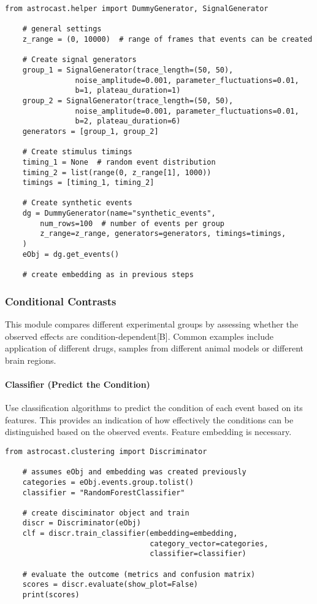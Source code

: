 \begin{lstlisting}[style=pyStyle]
    from astrocast.helper import DummyGenerator, SignalGenerator

    # general settings
    z_range = (0, 10000)  # range of frames that events can be created

    # Create signal generators
    group_1 = SignalGenerator(trace_length=(50, 50),
                noise_amplitude=0.001, parameter_fluctuations=0.01,
                b=1, plateau_duration=1)
    group_2 = SignalGenerator(trace_length=(50, 50),
                noise_amplitude=0.001, parameter_fluctuations=0.01,
                b=2, plateau_duration=6)
    generators = [group_1, group_2]

    # Create stimulus timings
    timing_1 = None  # random event distribution
    timing_2 = list(range(0, z_range[1], 1000))
    timings = [timing_1, timing_2]

    # Create synthetic events
    dg = DummyGenerator(name="synthetic_events",
        num_rows=100  # number of events per group
        z_range=z_range, generators=generators, timings=timings,
    )
    eObj = dg.get_events()

    # create embedding as in previous steps
\end{lstlisting}

\subsubsection{Conditional Contrasts}
This module compares different experimental groups by assessing whether the observed effects are condition-dependent[B]. Common examples include application of different drugs, samples from different animal models or different brain regions.

\paragraph{Classifier (Predict the Condition)}
Use classification algorithms to predict the condition of each event based on its features. This provides an indication of how effectively the conditions can be distinguished based on the observed events. Feature embedding is necessary.

\begin{lstlisting}[style=pyStyle]
    from astrocast.clustering import Discriminator

    # assumes eObj and embedding was created previously
    categories = eObj.events.group.tolist()
    classifier = "RandomForestClassifier"

    # create disciminator object and train
    discr = Discriminator(eObj)
    clf = discr.train_classifier(embedding=embedding,
                                 category_vector=categories,
                                 classifier=classifier)

    # evaluate the outcome (metrics and confusion matrix)
    scores = discr.evaluate(show_plot=False)
    print(scores)
\end{lstlisting}

